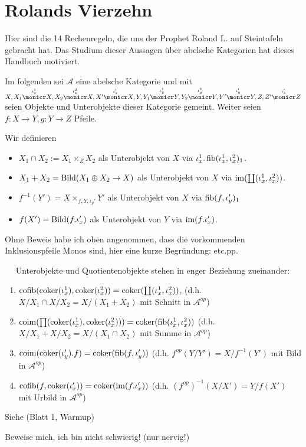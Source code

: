 \section{Rolands Vierzehn}

Hier sind die 14 Rechenregeln, die uns der Prophet Roland L. auf Steintafeln gebracht hat. Das Studium dieser Aussagen über abelsche Kategorien hat dieses Handbuch motiviert.

Im folgenden sei $\mathcal A$ eine abelsche Kategorie und mit $X,
X_1 \overset{\iota_x^1}\monicr X,
X_2 \overset{\iota_x^2}\monicr X,
X'  \overset{\iota_x'}\monicr X,
Y,
Y_1 \overset{\iota_y^1}\monicr Y,
Y_2 \overset{\iota_y^2}\monicr Y,
Y'  \overset{\iota_y'}\monicr Y,
Z,
Z'  \overset{\iota_z'}\monicr Z$
seien Objekte und Unterobjekte dieser Kategorie gemeint.
Weiter seien $f:X\to Y, g:Y\to Z$ Pfeile.

\begin{defn}[Objektnotation]
Wir definieren
\begin{itemize}
\item $X_1 \cap X_2 := X_1\times_Z X_2$ als Unterobjekt von $X$ via $\iota_x^1.\operatorname{fib}(\iota_x^1, \iota_x^2)_1$.
\item $X_1+X_2 = \operatorname{Bild}(X_1 \oplus X_2 \to X)$ als Unterobjekt von $X$ via $\operatorname{im}(\coprod(\iota_x^1,\iota_x^2))$.
\item $f^{-1}(Y') = X \times_{f,Y,\iota_y'} Y'$ als Unterobjekt von $X$ via $\operatorname{fib}(f,\iota_y')_1$
\item $f(X') = \operatorname{Bild}(f.\iota_x')$ als Unterobjekt von $Y$ via $\operatorname{im}(f.\iota_x')$.
\end{itemize}
\end{defn}

\begin{bem}
Ohne Beweis habe ich oben angenommen, dass die vorkommenden Inklusionspfeile Monos sind, hier eine kurze Begründung: etc.pp. %
\end{bem}

\begin{prop}[Reflexionsprinzip] $\quad$ %
Unterobjekte und Quotientenobjekte stehen in enger Beziehung zueinander:
\begin{enumerate}
\item $\operatorname{cofib}(\operatorname{coker}(\iota_x^1), \operatorname{coker}(\iota_x^2)) = \operatorname{coker}(\coprod(\iota_x^1,\iota_x^2))$, (d.h. $X/X_1 \cap X/X_2 = X/(X_1+X_2)$ mit Schnitt in $\mathcal A^{op}$)
\item $\operatorname{coim}(\prod(\operatorname{coker}(\iota_x^1),\operatorname{coker}(\iota_x^2))) = \operatorname{coker}(\operatorname{fib}(\iota_x^1,\iota_x^2))$ (d.h. $X/X_1 + X/X_2 = X/(X_1\cap X_2)$ mit Summe in $\mathcal A^{op}$)
\item $\operatorname{coim}(\operatorname{coker}(\iota_y').f) = \operatorname{coker}(\operatorname{fib}(f,\iota_y'))$ (d.h. $f^{op}(Y/Y') = X/f^{-1}(Y')$ mit Bild in $\mathcal A^{op}$)
\item $\operatorname{cofib}(f,\operatorname{coker}(\iota_x')) = \operatorname{coker}(\operatorname{im}(f.\iota_x'))$ (d.h. $(f^{op})^{-1}(X/X') = Y/f(X')$ mit Urbild in $\mathcal A^{op}$)
\end{enumerate}
Siehe (Blatt 1, Warmup)
\end{prop}
\begin{bew}
Beweise mich, ich bin nicht schwierig! (nur nervig!)
\end{bew}

